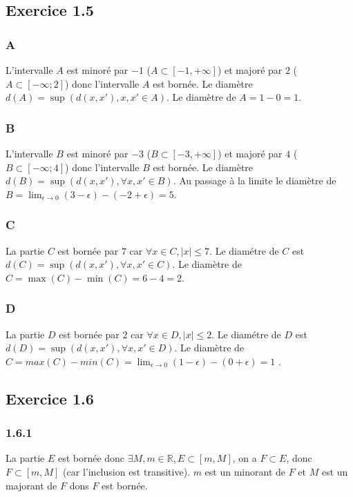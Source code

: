 \documentclass[]{book}
\theoremstyle{definition}
\newcommand{\bb}[1]{\mathbb{#1}}
\newcommand{\R}{\bb{R}}
\begin{document}
\subsection*{Exercice 1.5} 
\subsubsection*{A}
L'intervalle $A$ est minor\'e par $-1$ ($A \subset [-1,+\infty]$) et major\'e par $2$ ($A \subset [-\infty; 2]$) donc l'intervalle $A$ est born\'ee. Le diam\`etre $d(A) = \sup(d(x,x'),x,x' \in A)$. Le diam\`etre de $A = 1-0 = 1$.

\subsubsection*{B}
L'intervalle $B$ est minor\'e par $-3$ ($B \subset [-3,+\infty]$) et major\'e par $4$ ($B \subset [-\infty; 4]$) donc l'intervalle $B$ est born\'ee. Le diam\`etre $d(B) = \sup(d(x,x'), \forall x,x' \in B)$. Au passage \`a la limite le diam\`etre de $B = \lim_{\epsilon \to 0} (3-\epsilon)-(-2+\epsilon) = 5$.

\subsubsection*{C}
La partie $C$ est born\'ee par $7$ car $\forall x \in C, |x| \leq 7$. Le diam\'etre de $C$ est $d(C) = \sup(d(x,x'), \forall x,x' \in C)$. Le diam\`etre de $C = \max(C) - \min(C) = 6 -4 = 2$.  

\subsubsection*{D}
La partie $D$ est born\'ee par $2$ car $\forall x \in D, |x| \leq 2$. Le diam\'etre de $D$ est $d(D) = \sup(d(x,x'), \forall x,x' \in D)$. Le diam\`etre de $C = max(C)-min(C) = \lim_{\epsilon \to 0} (1-\epsilon) - (0+\epsilon) = 1$ .  


\subsection*{Exercice 1.6}
\subsubsection*{1.6.1}
La partie $E$ est born\'ee donc $\exists M,m \in \R, E \subset [m,M]$, on a $F \subset E$, donc $F \subset [m,M]$ (car l'inclusion est transitive). $m$ est un minorant de $F$ et $M$ est un majorant de $F$ dons $F$ est born\'ee.
\end{document}
